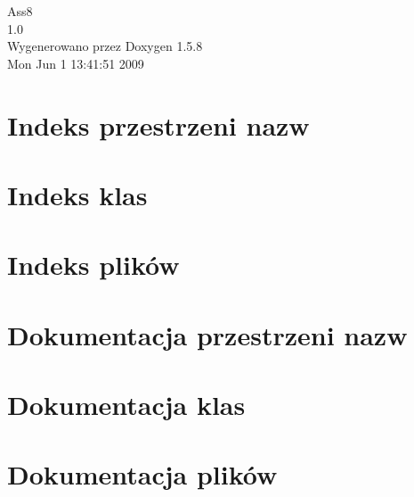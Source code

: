 \documentclass[a4paper]{book}
\begin{document}
\begin{titlepage}
\vspace*{7cm}
\begin{center}
{\Large Ass8 \\[1ex]\large 1.0 }\\
\vspace*{1cm}
{\large Wygenerowano przez Doxygen 1.5.8}\\
\vspace*{0.5cm}
{\small Mon Jun 1 13:41:51 2009}\\
\end{center}
\end{titlepage}
\clearemptydoublepage
{}
\tableofcontents
\clearemptydoublepage
{}
\chapter{Indeks przestrzeni nazw}

\chapter{Indeks klas}

\chapter{Indeks plików}

\chapter{Dokumentacja przestrzeni nazw}

\chapter{Dokumentacja klas}





\chapter{Dokumentacja plików}













\printindex
\end{document}
